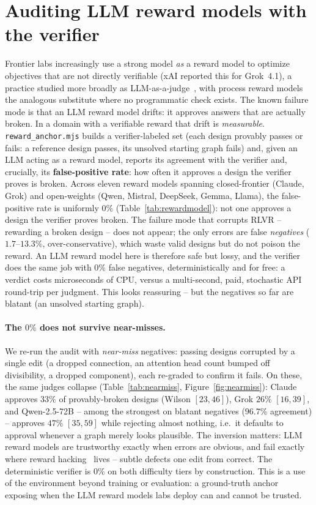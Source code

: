 \documentclass[11pt]{article}
\begin{document}
\section{Auditing LLM reward models with the verifier}
Frontier labs increasingly use a strong model \emph{as} a reward model to optimize objectives that are not directly verifiable (xAI reported this for Grok~4.1), a practice studied more broadly as LLM-as-a-judge~\cite{llmjudge}, with process reward models~\cite{prm} the analogous substitute where no programmatic check exists. The known failure mode is that an LLM reward model drifts: it approves answers that are actually broken. In a domain with a verifiable reward that drift is \emph{measurable}. \texttt{reward\_anchor.mjs} builds a verifier-labeled set (each design provably passes or fails: a reference design passes, its unsolved starting graph fails) and, given an LLM acting as a reward model, reports its agreement with the verifier and, crucially, its \textbf{false-positive rate}: how often it approves a design the verifier proves is broken. Across eleven reward models spanning closed-frontier (Claude, Grok) and open-weights (Qwen, Mistral, DeepSeek, Gemma, Llama), the false-positive rate is uniformly $0\%$ (Table~\ref{tab:rewardmodel}): not one approves a design the verifier proves broken. The failure mode that corrupts RLVR -- rewarding a broken design -- does not appear; the only errors are false \emph{negatives} ($1.7$--$13.3\%$, over-conservative), which waste valid designs but do not poison the reward. An LLM reward model here is therefore safe but lossy, and the verifier does the same job with $0\%$ false negatives, deterministically and for free: a verdict costs microseconds of CPU, versus a multi-second, paid, stochastic API round-trip per judgment. This looks reassuring -- but the negatives so far are blatant (an unsolved starting graph).

\paragraph{The $0\%$ does not survive near-misses.} We re-run the audit with \emph{near-miss} negatives: passing designs corrupted by a single edit (a dropped connection, an attention head count bumped off divisibility, a dropped component), each re-graded to confirm it fails. On these, the same judges collapse (Table~\ref{tab:nearmiss}, Figure~\ref{fig:nearmiss}): Claude approves $33\%$ of provably-broken designs (Wilson $[23,46]$), Grok $26\%$ $[16,39]$, and Qwen-2.5-72B -- among the strongest on blatant negatives ($96.7\%$ agreement) -- approves $47\%$ $[35,59]$ while rejecting almost nothing, i.e.\ it defaults to approval whenever a graph merely looks plausible. The inversion matters: LLM reward models are trustworthy exactly when errors are obvious, and fail exactly where reward hacking~\cite{rewardgaming} lives -- subtle defects one edit from correct. The deterministic verifier is $0\%$ on both difficulty tiers by construction. This is a use of the environment beyond training or evaluation: a ground-truth anchor exposing when the LLM reward models labs deploy can and cannot be trusted.
\end{document}
